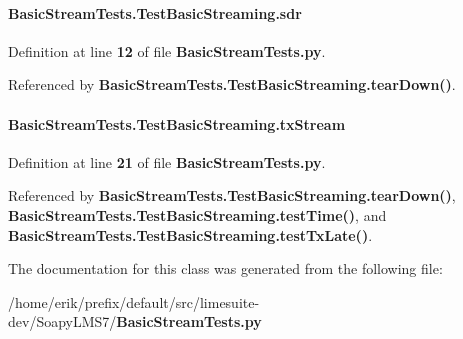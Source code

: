 \paragraph[{sdr}]{\setlength{\rightskip}{0pt plus 5cm}Basic\+Stream\+Tests.\+Test\+Basic\+Streaming.\+sdr}\label{classBasicStreamTests_1_1TestBasicStreaming_a40c0fc50c16602366c4f75f3b318505e}


Definition at line {\bf 12} of file {\bf Basic\+Stream\+Tests.\+py}.



Referenced by {\bf Basic\+Stream\+Tests.\+Test\+Basic\+Streaming.\+tear\+Down()}.

\paragraph[{tx\+Stream}]{\setlength{\rightskip}{0pt plus 5cm}Basic\+Stream\+Tests.\+Test\+Basic\+Streaming.\+tx\+Stream}\label{classBasicStreamTests_1_1TestBasicStreaming_af6ed219070ea86529f44995a9001116a}


Definition at line {\bf 21} of file {\bf Basic\+Stream\+Tests.\+py}.



Referenced by {\bf Basic\+Stream\+Tests.\+Test\+Basic\+Streaming.\+tear\+Down()}, {\bf Basic\+Stream\+Tests.\+Test\+Basic\+Streaming.\+test\+Time()}, and {\bf Basic\+Stream\+Tests.\+Test\+Basic\+Streaming.\+test\+Tx\+Late()}.



The documentation for this class was generated from the following file\+:\begin{DoxyCompactItemize}
\item 
/home/erik/prefix/default/src/limesuite-\/dev/\+Soapy\+L\+M\+S7/{\bf Basic\+Stream\+Tests.\+py}\end{DoxyCompactItemize}
